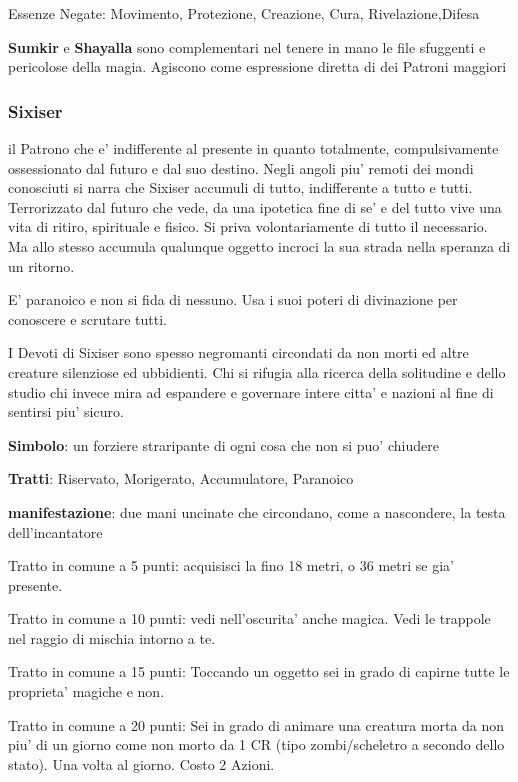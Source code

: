 \documentclass[a4paper,11pt,twoside,openany]{book}
\begin{document}
{		Essenze Negate: Movimento, Protezione, Creazione, Cura, Rivelazione,Difesa
		
		\textbf{Sumkir} e \textbf{Shayalla} sono complementari nel tenere in mano le file sfuggenti e pericolose della magia. Agiscono come espressione diretta di dei Patroni maggiori
		
		\subsubsection{Sixiser}
		
		il Patrono che e' indifferente al presente in quanto totalmente, compulsivamente ossessionato dal futuro e dal suo destino. Negli angoli piu' remoti dei mondi conosciuti si narra che Sixiser accumuli di tutto, indifferente a tutto e tutti. Terrorizzato dal futuro che vede, da una ipotetica fine di se' e del tutto vive una vita di ritiro, spirituale e fisico. Si priva volontariamente di tutto il necessario. Ma allo stesso accumula qualunque oggetto incroci la sua strada nella speranza di un ritorno.
		
		E' paranoico e non si fida di nessuno. Usa i suoi poteri di divinazione per conoscere e scrutare tutti.
		
		I Devoti di Sixiser sono spesso negromanti circondati da non morti ed altre creature silenziose ed ubbidienti. Chi si rifugia alla ricerca della solitudine e dello studio chi invece mira ad espandere e governare intere citta' e nazioni al fine di sentirsi piu' sicuro.
		
		\textbf{Simbolo}: un forziere straripante di ogni cosa che non si puo' chiudere
		
		\textbf{Tratti}: Riservato, Morigerato, Accumulatore, Paranoico
		
		\textbf{manifestazione}: due mani uncinate che circondano, come a nascondere, la testa dell'incantatore
		
		\bigskip
		
		Tratto in comune a 5 punti: acquisisci la fino 18 metri, o 36 metri se gia' presente.
		
		Tratto in comune a 10 punti: vedi nell'oscurita' anche magica. Vedi le trappole nel raggio di mischia intorno a te.
		
		Tratto in comune a 15 punti: Toccando un oggetto sei in grado di capirne tutte le proprieta' magiche e non.
		
		Tratto in comune a 20 punti: Sei in grado di animare una creatura morta da non piu' di un giorno come non morto da 1 CR (tipo zombi/scheletro a secondo dello stato). Una volta al giorno. Costo 2 Azioni.
		
}
\end{document}
